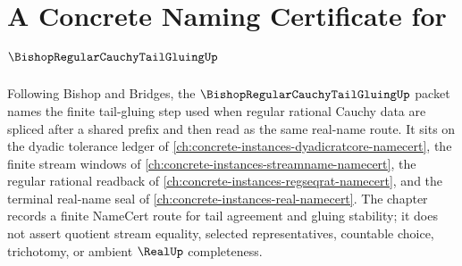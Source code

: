 \chapter{A Concrete Naming Certificate for $\BishopRegularCauchyTailGluingUp$}
\label{ch:concrete-instances-bishop-regular-cauchy-tail-gluing-namecert}

Following Bishop and Bridges, the $\BishopRegularCauchyTailGluingUp$ packet names the finite tail-gluing step used when regular rational Cauchy data are spliced after a shared prefix and then read as the same real-name route. It sits on the dyadic tolerance ledger of \autoref{ch:concrete-instances-dyadicratcore-namecert}, the finite stream windows of \autoref{ch:concrete-instances-streamname-namecert}, the regular rational readback of \autoref{ch:concrete-instances-regseqrat-namecert}, and the terminal real-name seal of \autoref{ch:concrete-instances-real-namecert}. The chapter records a finite NameCert route for tail agreement and gluing stability; it does not assert quotient stream equality, selected representatives, countable choice, trichotomy, or ambient $\RealUp$ completeness.

